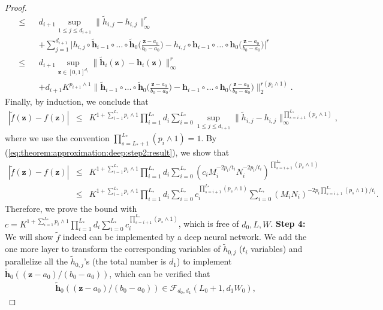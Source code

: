 \documentclass[11pt, preprint]{imsart}
\numberwithin{equation}{section}
\def \mcF{\mathcal{F}}
\def \bfz{\mathbf{z}}
\def \bfh{\mathbf{h}}
\theoremstyle{plain}
\theoremstyle{definition}
\begin{document}
\begin{proof}
\begin{eqnarray*}
\leq&& d_{i+1}\sup_{1\leq j \leq d_{i+1}}\|\widetilde{h}_{i,j}-h_{i,j}\|_\infty^{r}\nonumber\\
&&+\sum_{j=1}^{d_{i+1}}\bigg|h_{i,j}\circ\widetilde{\bfh}_{i-1}\circ\ldots\circ \widetilde{\bfh}_0\bigg(\frac{\bfz-a_0}{b_0-a_0}\bigg)-h_{i,j}\circ\bfh_{i-1}\circ\ldots\circ \bfh_0\bigg(\frac{\bfz-a_0}{b_0-a_0}\bigg)\bigg|^{r}\nonumber\\
\leq&& d_{i+1}\sup_{\bfz \in [0, 1]^{d_i}}\|\widetilde{\bfh}_i(\bfz)-\bfh_i(\bfz)\|_\infty^{r}\nonumber\\
&&+d_{i+1}K^{p_{i+1}\wedge 1}\bigg\|\widetilde{\bfh}_{i-1}\circ\ldots\circ \widetilde{\bfh}_0\bigg(\frac{\bfz-a_0}{b_0-a_0}\bigg)-\bfh_{i-1}\circ\ldots\circ \bfh_0\bigg(\frac{\bfz-a_0}{b_0-a_0}\bigg)\bigg\|_2^{r(p_{i}\wedge 1)}.
\end{eqnarray*}
Finally, by induction, we conclude that
\begin{eqnarray*}
|\widetilde{f}(\bfz)-{f}(\bfz)|&\leq& K^{1+\sum_{i=1}^{L_*}p_i\wedge 1}\prod_{i=1}^{L_*}d_i \sum_{i=0}^{L_*}\sup_{1\leq j \leq d_{i+1}}\|\widetilde{h}_{i,j}-h_{i,j}\|_\infty^{\prod_{s=i+1}^{L_*}(p_s\wedge 1)},
\end{eqnarray*}
where we use the convention $\prod_{s=L_*+1}^{L_*}(p_i \wedge 1)=1$. By (\ref{eq:theorem:approximation:deep:step2:result}), we show that 
\begin{eqnarray*}
	|\widetilde{f}(\bfz)-{f}(\bfz)|&\leq& K^{1+\sum_{i=1}^{L_*}p_i\wedge 1}\prod_{i=1}^{L_*}d_i \sum_{i=0}^{L_*}(c_{i}M_i^{-2p_i/t_i}N_i^{-2p_i/t_i})^{\prod_{s=i+1}^{L_*}(p_s\wedge 1)}\nonumber\\
	&\leq&  K^{1+\sum_{i=1}^{L_*}p_i\wedge 1}\prod_{i=1}^{L_*}d_i\sum_{i=0}^{L_*}c_i^{\prod_{s=i+1}^{L_*}(p_s\wedge 1)}  \sum_{i=0}^{L_*}(M_iN_i)^{-2p_i\prod_{s=i+1}^{L_*}(p_s\wedge 1)/t_i}\nonumber.
\end{eqnarray*}
Therefore, we prove the bound with $c=K^{1+\sum_{i=1}^{L_*}p_i\wedge 1}\prod_{i=1}^{L_*}d_i\sum_{i=0}^{L_*}c_i^{\prod_{s=i+1}^{L_*}(p_s\wedge 1)}$, which is free of $d_0, L, W$.
\newline
\noindent\textbf{Step 4:}  We will show $\widetilde{f}$ indeed can be implemented by a deep neural network. We add the one more layer to transform the corresponding variables of $\widetilde{h}_{0,j}$ ($t_i$ variables) and parallelize all the $\widetilde{h}_{0,j}$'s (the total number is $d_1$) to implement $\widetilde{\bfh}_0((\bfz-a_0)/(b_0-a_0))$, which can be verified that 
\begin{eqnarray*}
\widetilde{\bfh}_0((\bfz-a_0)/(b_0-a_0))\in \mcF_{d_0, d_1}(L_0+1, d_1W_0),

\end{eqnarray*}
\end{proof}
\end{document}

